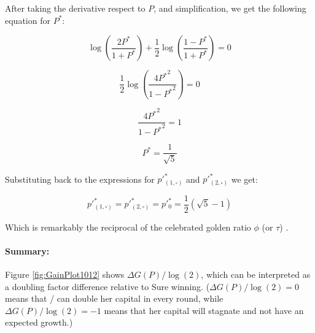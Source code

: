 \documentclass{article}
\newcommand{\wb}{\square}
\theoremstyle{definition}
\begin{document}
After taking the derivative respect to $P$, and simplification, we get the following equation for $P^*$:

\begin{equation}
    \log \left ( \frac{2 P^*}{1 + P^*} \right ) +
    \frac{1}{2} \log \left ( \frac{1 - P^*}{1 + P^*} \right ) = 0
\end{equation}

\begin{equation}
    \frac{1}{2} \log \left ( \frac{4 {P^*}^2}{1 - {P^*}^2} \right ) = 0
\end{equation}

\begin{equation}
     \frac{4 {P^*}^2}{1 - {P^*}^2}  = 1
\end{equation}

\begin{equation}
     P^*  = \frac{1}{\sqrt{5}}
\end{equation}

Substituting back to the expressions for $p'^*_{(1,\wb)}$ and $p'^*_{(2,\wb)}$ we get:

\begin{equation}
     p'^*_{(1,\wb)} = p'^*_{(2,\wb)} = p'^*_0 = \frac{1}{2} \left ( \sqrt{5} -1 \right )
\end{equation}

Which is remarkably the reciprocal of the celebrated golden ratio $\phi$ (or $\tau$) \cite{book:Fibinacci, book:MathConstants, book:ConwayBookOfNumbers}.

\paragraph{Summary:}

Figure \ref{fig:GainPlot1012} shows $\Delta G(P)/\log(2)$, which can be interpreted as a doubling factor difference relative to Sure winning. ($\Delta G(P)/\log(2)=0$ means that \PI/ can double her capital in every round, while $\Delta G(P)/\log(2)=-1$ means that her capital will stagnate and not have an expected growth.)
\end{document}

